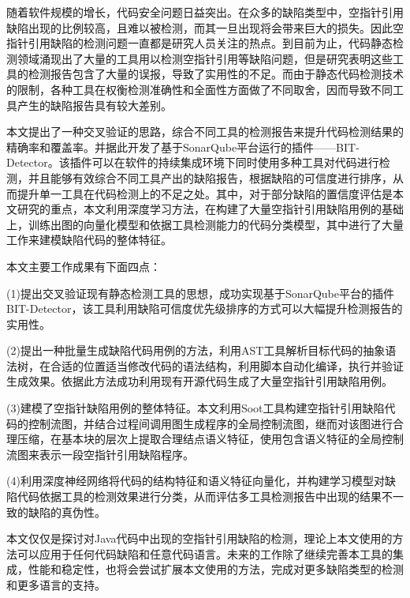 

\begin{conclusion}

随着软件规模的增长，代码安全问题日益突出。在众多的缺陷类型中，空指针引用缺陷出现的比例较高，且难以被检测，而其一旦出现将会带来巨大的损失。因此空指针引用缺陷的检测问题一直都是研究人员关注的热点。到目前为止，代码静态检测领域涌现出了大量的工具用以检测空指针引用等缺陷问题，但是研究表明这些工具的检测报告包含了大量的误报，导致了实用性的不足。而由于静态代码检测技术的限制，各种工具在权衡检测准确性和全面性方面做了不同取舍，因而导致不同工具产生的缺陷报告具有较大差别。

本文提出了一种交叉验证的思路，综合不同工具的检测报告来提升代码检测结果的精确率和覆盖率。并据此开发了基于SonarQube平台运行的插件——BIT-Detector。该插件可以在软件的持续集成环境下同时使用多种工具对代码进行检测，并且能够有效综合不同工具产出的缺陷报告，根据缺陷的可信度进行排序，从而提升单一工具在代码检测上的不足之处。其中，对于部分缺陷的置信度评估是本文研究的重点，本文利用深度学习方法，在构建了大量空指针引用缺陷用例的基础上，训练出图的向量化模型和依据工具检测能力的代码分类模型，其中进行了大量工作来建模缺陷代码的整体特征。

本文主要工作成果有下面四点：

(1)提出交叉验证现有静态检测工具的思想，成功实现基于SonarQube平台的插件BIT-Detector，该工具利用缺陷可信度优先级排序的方式可以大幅提升检测报告的实用性。

(2)提出一种批量生成缺陷代码用例的方法，利用AST工具解析目标代码的抽象语法树，在合适的位置适当修改代码的语法结构，利用脚本自动化编译，执行并验证生成效果。依据此方法成功利用现有开源代码生成了大量空指针引用缺陷用例。

(3)建模了空指针缺陷用例的整体特征。本文利用Soot工具构建空指针引用缺陷代码的控制流图，并结合过程间调用图生成程序的全局控制流图，继而对该图进行合理压缩，在基本块的层次上提取合理结点语义特征，使用包含语义特征的全局控制流图来表示一段空指针引用缺陷程序。

(4)利用深度神经网络将代码的结构特征和语义特征向量化，并构建学习模型对缺陷代码依据工具的检测效果进行分类，从而评估多工具检测报告中出现的结果不一致的缺陷的真伪性。

本文仅仅是探讨对Java代码中出现的空指针引用缺陷的检测，理论上本文使用的方法可以应用于任何代码缺陷和任意代码语言。未来的工作除了继续完善本工具的集成，性能和稳定性，也将会尝试扩展本文使用的方法，完成对更多缺陷类型的检测和更多语言的支持。

\end{conclusion}